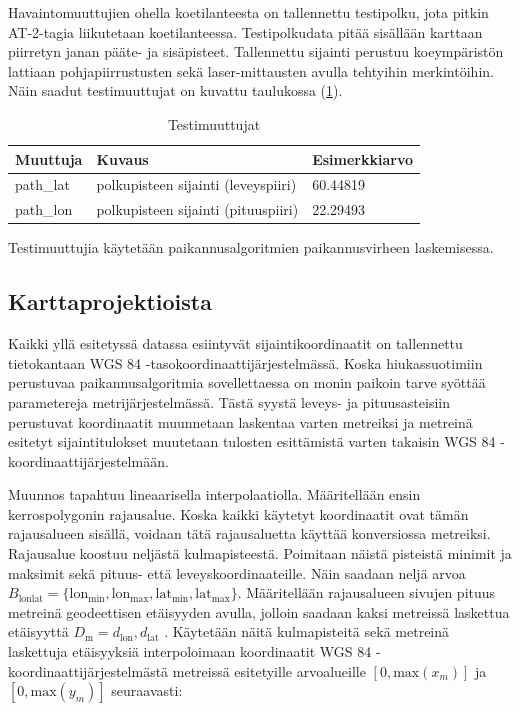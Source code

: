 \documentclass[
  12pt,
  a4paper, twoside]{book}
\begin{document}
Havaintomuuttujien ohella koetilanteesta on tallennettu testipolku, jota pitkin AT-2-tagia liikutetaan koetilanteessa. Testipolkudata pitää sisällään karttaan piirretyn janan pääte- ja sisäpisteet. Tallennettu sijainti perustuu koeympäristön lattiaan pohjapiirrustusten sekä laser-mittausten avulla tehtyihin merkintöihin. Näin saadut testimuuttujat on kuvattu taulukossa (\ref{tab:testimuuttujat}).

\def\arraystretch{1.25} 
\begin{table}[H]
\centering
\begin{tabular}{|l|l|l|}
\hline
Muuttuja & Kuvaus & Esimerkkiarvo\\
\hline
path\_lat & polkupisteen sijainti (leveyspiiri) & 60.44819 \\
path\_lon & polkupisteen sijainti (pituuspiiri) & 22.29493 \\
\hline
\end{tabular}
\caption{Testimuuttujat}
\label{tab:testimuuttujat}
\end{table}

\noindent Testimuuttujia käytetään paikannusalgoritmien paikannusvirheen laskemisessa.

\subsection{Karttaprojektioista}

Kaikki yllä esitetyssä datassa esiintyvät sijaintikoordinaatit on tallennettu tietokantaan WGS 84 -tasokoordinaattijärjestelmässä. Koska hiukassuotimiin perustuvaa paikannusalgoritmia sovellettaessa on monin paikoin tarve syöttää parametereja metrijärjestelmässä. Tästä syystä leveys- ja pituusasteisiin perustuvat koordinaatit muunnetaan laskentaa varten metreiksi ja metreinä esitetyt sijaintitulokset muutetaan tulosten esittämistä varten takaisin WGS 84 -koordinaattijärjestelmään.

Muunnos tapahtuu lineaarisella interpolaatiolla. Määritellään ensin kerrospolygonin rajausalue. Koska kaikki käytetyt koordinaatit ovat tämän rajausalueen sisällä, voidaan tätä rajausaluetta käyttää konversiossa metreiksi. Rajausalue koostuu neljästä kulmapisteestä. Poimitaan näistä pisteistä minimit ja maksimit sekä pituus- että leveyskoordinaateille. Näin saadaan neljä arvoa \(B_{\text{lonlat}}=\{\text{lon}_{\text{min}}, \text{lon}_{\text{max}}, \text{lat}_{\text{min}}, \text{lat}_{\text{max}}\}\). Määritellään rajausalueen sivujen pituus metreinä geodeettisen etäisyyden avulla, jolloin saadaan kaksi metreissä laskettua etäisyyttä \(D_{\text{m}}={d_{\text{lon}}, d_{\text{lat}}}\) . Käytetään näitä kulmapisteitä sekä metreinä laskettuja etäisyyksiä interpoloimaan koordinaatit WGS 84 -koordinaattijärjestelmästä metreissä esitetyille arvoalueille \([0, \text{max}(x_m)]\) ja \([0, \text{max}(y_m)]\) seuraavasti:
\end{document}
